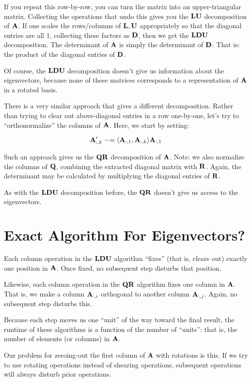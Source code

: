 \documentclass[11pt, oneside]{amsart}
\begin{document}
If you repeat this row-by-row, you can turn the matrix into an
upper-triangular matrix. Collecting the operations that undo this gives
you the $\mathbf{L}\mathbf{U}$ decomposition of $\mathbf{A}$. If one scales the
rows/columns of $\mathbf{L}, \mathbf{U}$ appropriately so that the diagonal
entries are all $1$, collecting these factors as $\mathbf{D}$, then we get
the $\mathbf{L}\mathbf{D}\mathbf{U}$ decomposition. The determinant of $\mathbf{A}$ is simply the
determinant of $\mathbf{D}$. That is: the product of the diagonal entries of
$\mathbf{D}$.

Of course, the $\mathbf{L}\mathbf{D}\mathbf{U}$ decomposition doesn't give us information about
the eigenvectors, because none of these matrices corresponds to a
representation of $\mathbf{A}$ in a rotated basis.

There is a very similar approach that gives a different decomposition.
Rather than trying to clear out above-diagonal entries in a row
one-by-one, let's try to ``orthonormalize'' the columns of $\mathbf{A}$.
Here, we start by setting:

\[
  \mathbf{A}'_{:, k} \mathrel{-}= \langle \mathbf{A}_{:, 1}, \mathbf{A}_{:,k} \rangle \mathbf{A}_{:, 1}
\]

Such an approach gives us the $\mathbf{Q}\mathbf{R}$ decomposition of $\mathbf{A}$.
Note: we also normalize the columns of $\mathbf{Q}$, combining the extracted
diagonal matrix with $\mathbf{R}$. Again, the determinant may be calculated
by multiplying the diagonal entries of $\mathbf{R}$.

As with the $\mathbf{L}\mathbf{D}\mathbf{U}$ decomposition before, the $\mathbf{Q}\mathbf{R}$ doesn't give us
access to the eigenvectors.

\section{Exact Algorithm For Eigenvectors?}

Each column operation in the $\mathbf{L}\mathbf{D}\mathbf{U}$ algorithm ``fixes'' (that is,
clears out) exactly one position in $\mathbf{A}$. Once fixed, no subsequent
step disturbs that position.

Likewise, each column operation in the $\mathbf{Q}\mathbf{R}$ algorithm fixes one
column in $\mathbf{A}$. That is, we make a column $\mathbf{A}_{:, i}$ orthogonal
to another column $\mathbf{A}_{:, j}$. Again, no subsequent step disturbs
this.

Because each step moves us one ``unit'' of the way toward the final
result, the runtime of these algorithms is a function of the number of
``units'': that is, the number of elements (or columns) in $\mathbf{A}$.

Our problem for zeroing-out the first column of $\mathbf{A}$ with rotations
is this. If we try to use rotating operations instead of shearing
operations, subsequent operations will always disturb prior operations.
\end{document}

